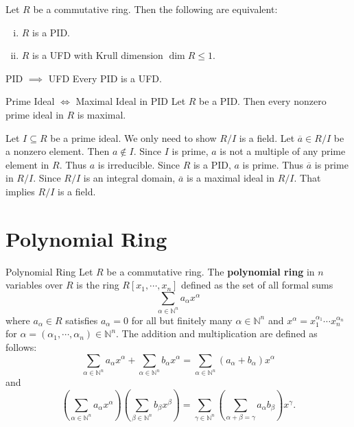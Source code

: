 \begin{proposition}{}{}
    Let $R$ be a commutative ring. Then the following are equivalent:
    \begin{enumerate}[(i)]
        \item $R$ is a PID.
        \item $R$ is a UFD with Krull dimension $\dim R \le 1$.
    \end{enumerate}
\end{proposition}
\begin{corollary}{PID $\implies$ UFD}{}
    Every PID is a UFD.
\end{corollary}


\begin{proposition}{Prime Ideal $\iff$ Maximal Ideal in PID}{}
    Let $R$ be a PID. Then every nonzero prime ideal in $R$ is maximal.
\end{proposition}

\begin{prf}
    Let $I\subseteq R$ be a prime ideal. We only need to show $R/I$ is a field. Let $\overline{a}\in R/I$ be a nonzero element. Then $a\notin I$. Since $I$ is prime, $a$ is not a multiple of any prime element in $R$. Thus $a$ is irreducible. Since $R$ is a PID, $a$ is prime. Thus $\overline{a}$ is prime in $R/I$. Since $R/I$ is an integral domain, $\overline{a}$ is a maximal ideal in $R/I$. That implies $R/I$ is a field.
\end{prf}







\section{Polynomial Ring}
\begin{definition}{Polynomial Ring}{}
    Let $R$ be a commutative ring. The \textbf{polynomial ring} in $n$ variables over $R$ is the ring $R[x_1,\cdots,x_n]$ defined as the set of all formal sums $$\sum_{\alpha\in\mathbb{N}^n}a_\alpha x^\alpha$$ where $a_\alpha\in R$ satisfies $a_\alpha=0$ for all but finitely many $\alpha\in\mathbb{N}^n$ and $x^\alpha=x_1^{\alpha_1}\cdots x_n^{\alpha_n}$ for $\alpha=(\alpha_1,\cdots,\alpha_n)\in\mathbb{N}^n$. The addition and multiplication are defined as follows: $$\sum_{\alpha\in\mathbb{N}^n}a_\alpha x^\alpha+\sum_{\alpha\in\mathbb{N}^n}b_\alpha x^\alpha=\sum_{\alpha\in\mathbb{N}^n}(a_\alpha+b_\alpha)x^\alpha$$ and $$\left(\sum_{\alpha\in\mathbb{N}^n}a_\alpha x^\alpha\right)\left(\sum_{\beta\in\mathbb{N}^n}b_\beta x^\beta\right)=\sum_{\gamma\in\mathbb{N}^n}\left(\sum_{\alpha+\beta=\gamma}a_\alpha b_\beta\right)x^\gamma.$$
\end{definition}


